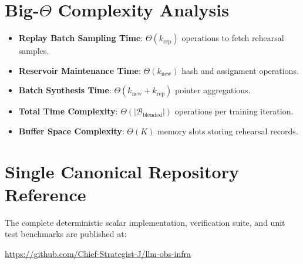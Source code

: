 \documentclass[11pt,a4paper]{article}
\theoremstyle{definition}
\begin{document}
\section{Big-$\Theta$ Complexity Analysis}

\begin{itemize}
    \item \textbf{Replay Batch Sampling Time}: $\Theta(k_{\text{rep}})$ operations to fetch rehearsal samples.
    \item \textbf{Reservoir Maintenance Time}: $\Theta(k_{\text{new}})$ hash and assignment operations.
    \item \textbf{Batch Synthesis Time}: $\Theta(k_{\text{new}} + k_{\text{rep}})$ pointer aggregations.
    \item \textbf{Total Time Complexity}: $\Theta(|\mathcal{B}_{\text{blended}}|)$ operations per training iteration.
    \item \textbf{Buffer Space Complexity}: $\Theta(K)$ memory slots storing rehearsal records.
\end{itemize}

\section{Single Canonical Repository Reference}

The complete deterministic scalar implementation, verification suite, and unit test benchmarks are published at:
\begin{center}
\url{https://github.com/Chief-Strategist-J/llm-obs-infra}
\end{center}
\end{document}
